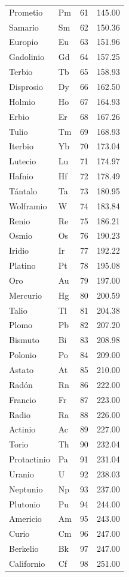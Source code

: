 \documentclass[12pt]{article}
\begin{document}
\begin{longtable}{llcc}
Prometio & Pm & 61 & 145.00 \\
Samario & Sm & 62 & 150.36 \\
Europio & Eu & 63 & 151.96 \\
Gadolinio & Gd & 64 & 157.25 \\
Terbio & Tb & 65 & 158.93 \\
Disprosio & Dy & 66 & 162.50 \\
Holmio & Ho & 67 & 164.93 \\
Erbio & Er & 68 & 167.26 \\
Tulio & Tm & 69 & 168.93 \\
Iterbio & Yb & 70 & 173.04 \\
Lutecio & Lu & 71 & 174.97 \\
Hafnio & Hf & 72 & 178.49 \\
Tántalo & Ta & 73 & 180.95 \\
Wolframio & W & 74 & 183.84 \\
Renio & Re & 75 & 186.21 \\
Osmio & Os & 76 & 190.23 \\
Iridio & Ir & 77 & 192.22 \\
Platino & Pt & 78 & 195.08 \\
Oro & Au & 79 & 197.00 \\
Mercurio & Hg & 80 & 200.59 \\
Talio & Tl & 81 & 204.38 \\
Plomo & Pb & 82 & 207.20 \\
Bismuto & Bi & 83 & 208.98 \\
Polonio & Po & 84 & 209.00 \\
Astato & At & 85 & 210.00 \\
Radón & Rn & 86 & 222.00 \\
Francio & Fr & 87 & 223.00 \\
Radio & Ra & 88 & 226.00 \\
Actinio & Ac & 89 & 227.00 \\
Torio & Th & 90 & 232.04 \\
Protactinio & Pa & 91 & 231.04 \\
Uranio & U & 92 & 238.03 \\
Neptunio & Np & 93 & 237.00 \\
Plutonio & Pu & 94 & 244.00 \\
Americio & Am & 95 & 243.00 \\
Curio & Cm & 96 & 247.00 \\
Berkelio & Bk & 97 & 247.00 \\
Californio & Cf & 98 & 251.00 \\

\end{longtable}
\end{document}
